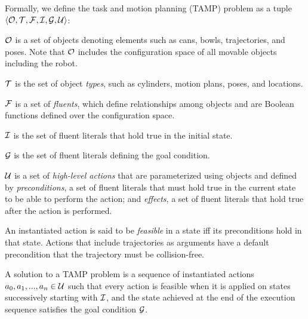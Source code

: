 \begin{defn}
Formally, we define the task and motion planning (TAMP) problem as a tuple $\langle \mathcal{O},
 \mathcal{T}, \mathcal{F}, \mathcal{I}, \mathcal{G}, \mathcal{U} \rangle$:
\begin{tightlist}
\item $\mathcal{O}$ is a set of objects denoting elements such as cans,
  bowls, trajectories, and poses. Note that $\mathcal{O}$ includes the
  configuration space of all movable objects including the robot.
\item $\mathcal{T}$ is the set of object \emph{types}, such as cylinders, motion plans, poses, and locations.
\item $\mathcal{F}$ is a set of \emph{fluents}, which define relationships
  among objects and are Boolean functions defined over the configuration space.
\item $\mathcal{I}$ is the set of fluent literals that hold true in the initial state.
\item $\mathcal{G}$ is the set of fluent literals defining the goal condition.
\item $\mathcal{U}$ is a set of \emph{high-level actions} that are
  parameterized using objects and defined by \emph{preconditions}, a set
of fluent literals that must hold true in the current state to be able to perform the action;
and \emph{effects}, a set of fluent literals that hold true after the
action is performed. 
\end{tightlist}
\end{defn}

An instantiated action is said to be \emph{feasible} in a state iff its
preconditions hold in that state. Actions that include trajectories as
arguments have a default precondition that the trajectory must be
collision-free.

A solution to a TAMP problem is a sequence of instantiated
actions $a_{0}, a_{1}, ..., a_{n} \in \mathcal{U}$ such that every action is
feasible when it is applied on states successively starting with $\mathcal{I}$, and the
state achieved at the end of the execution sequence satisfies the
goal condition $\mathcal{G}$.



